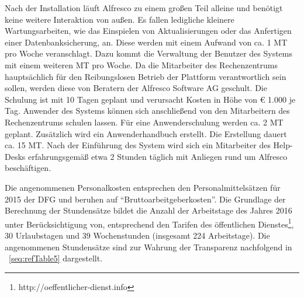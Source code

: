 \documentclass[a4paper]{article}
\begin{document}
{\sffamily
Nach der Installation läuft Alfresco zu einem großen Teil alleine und benötigt keine weitere Interaktion von außen. Es
fallen ledigliche kleinere Wartungsarbeiten, wie das Einspielen von Aktualisierungen oder das Anfertigen einer
Datenbanksicherung, an. Diese werden mit einem Aufwand von ca. 1 MT pro Woche veranschlagt. Dazu kommt die Verwaltung
der Benutzer des Systems mit einem weiteren MT pro Woche. Da die Mitarbeiter des Rechenzentrums hauptsächlich für den
Reibungslosen Betrieb der Plattform verantwortlich sein sollen, werden diese von Beratern der Alfresco Software AG
geschult. Die Schulung ist mit 10 Tagen geplant und verursacht Kosten in Höhe von € 1.000 je Tag. Anwender des Systems
können sich anschließend von den Mitarbeitern des Rechenzentrums schulen lassen. Für eine Anwenderschulung werden ca. 2
MT geplant. Zusätzlich wird ein Anwenderhandbuch erstellt. Die Erstellung dauert ca. 15 MT. Nach der Einführung des
System wird sich ein Mitarbeiter des Help-Desks erfahrungsgemäß etwa 2 Stunden täglich mit Anliegen rund um Alfresco
beschäftigen.}


\bigskip

{\sffamily
Die angenommenen Personalkosten entsprechen den Personalmittelsätzen für 2015 der DFG und beruhen auf
“Bruttoarbeitgeberkosten”. Die Grundlage der Berechnung der Stundensätze bildet die Anzahl der Arbeitstage des Jahres
2016 unter Berücksichtigung von, entsprechend den Tarifen des öffentlichen
Dienstes\footnote{http://oeffentlicher-dienst.info}, 30 Urlaubstagen und 39 Wochenstunden (insgesamt 224 Arbeitstage).
Die angenommenen Stundensätze sind zur Wahrung der Transparenz nachfolgend in \tablename~\ref{seq:refTable5}
dargestellt.}


\bigskip
\end{document}
